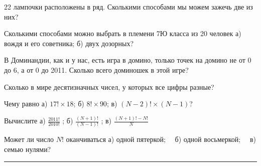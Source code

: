 \begin{thm}
	22 лампочки расположены в ряд. Сколькими способами мы можем зажечь две из них?
\end{thm}

\begin{thm}	
	Сколькими способами можно выбрать в племени 7Ю класса из 20 человек а) вождя и его советника; б) двух дозорных?
\end{thm}

\begin{thm}	
	В Доминандии, как и у нас, есть игра в домино, только точек на домино не от 0 до 6, а от 0 до 2011. Сколько всего доминошек в этой игре?
\end{thm}

\begin{thm}	
	Сколько в мире десятизначных чисел, у которых все цифры разные?
\end{thm}

\begin{thm}	
	Чему равно а) $17!\times 18$;  б) $8!\times 90$;  в) $(N - 2)!\times (N - 1)$?
\end{thm}

\begin{thm}\label{3.4}
	Вычислите а) $\frac{2011!}{2010!}$ ;  б) $\frac{(N+1)!}{(N-1)!}$ ; в)  $\frac{(N+1)!-N!}{N}$
\end{thm}


\begin{thm}	\label{3.5}
	Может ли число $N!$ оканчиваться а) одной пятеркой;~~ б) одной восьмеркой;~~ в) семью нулями?
\end{thm}

\hrule
